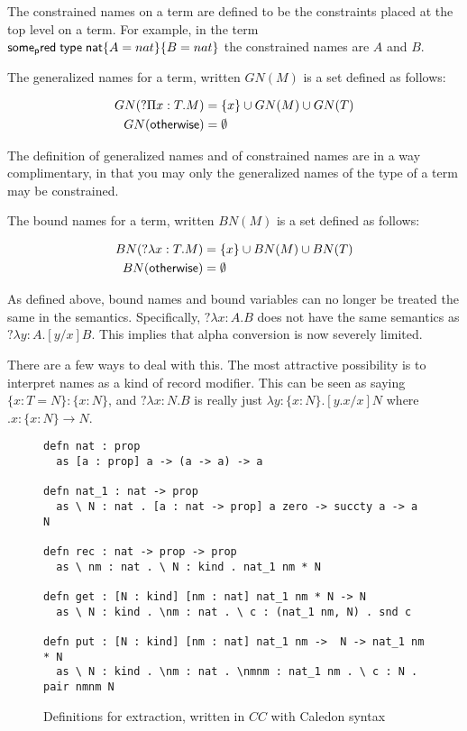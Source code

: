 The constrained names on a term are defined to be the constraints placed at the top level on 
a term.  For example, in the term $\mathsf{some_pred} \; \mathsf{type} \; \mathsf{nat} \{ A = nat \} \{ B = nat \}$ the constrained names are $A$ and $B$.  

\begin{definition}
The generalized names for a term, written $GN(M)$ is a set defined as follows:

\begin{align}
GN(?\Pi x : T . M) &= \{ x \} \cup GN(M) \cup GN(T)
\\
GN(\mathsf{otherwise}) &= \emptyset
\end{align}
\end{definition}

The definition of generalized names and of constrained names are in a way complimentary, in that
you may only the generalized names of the type of a term may be constrained.

\begin{definition}
The bound names for a term, written $BN(M)$ is a set defined as follows:

\begin{align} 
BN(?\lambda x : T . M) &= \{ x \} \cup BN(M) \cup BN(T)
\\
BN(\mathsf{otherwise}) &= \emptyset
\end{align}

\end{definition}

As defined above, bound names and bound variables can no longer be treated the same in the semantics.  
Specifically, $?\lambda x : A . B$ does not have the same semantics as $?\lambda y : A . [y / x] B$.  
This implies that alpha conversion is now severely limited.  

There are a few ways to deal with this.  
The most attractive possibility is to interpret names as a kind of record modifier.
This can be seen as saying $\{ x : T = N \} : \{ x : N \}$, 
and $?\lambda x : N . B$ is really just $\lambda y : \{ x : N \} . [ y.x / x ] N$ where $ .x : \{ x : N \} \rightarrow N$.

\begin{figure}[H]
\begin{lstlisting}
defn nat : prop 
  as [a : prop] a -> (a -> a) -> a

defn nat_1 : nat -> prop
  as \ N : nat . [a : nat -> prop] a zero -> succty a -> a N

defn rec : nat -> prop -> prop
  as \ nm : nat . \ N : kind . nat_1 nm * N

defn get : [N : kind] [nm : nat] nat_1 nm * N -> N
  as \ N : kind . \nm : nat . \ c : (nat_1 nm, N) . snd c

defn put : [N : kind] [nm : nat] nat_1 nm ->  N -> nat_1 nm * N
  as \ N : kind . \nm : nat . \nmnm : nat_1 nm . \ c : N . pair nmnm N
\end{lstlisting}
\caption{Definitions for extraction, written in $CC$ with Caledon syntax}
\label{code:ideal}
\end{figure}

